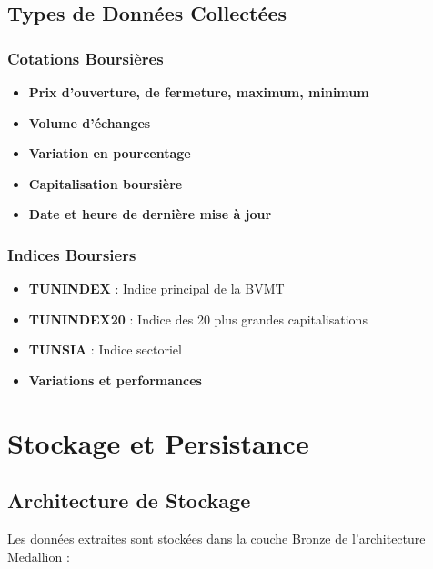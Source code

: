 \subsection{Types de Données Collectées}

\subsubsection{Cotations Boursières}

\begin{itemize}
    \item \textbf{Prix d'ouverture, de fermeture, maximum, minimum}
    \item \textbf{Volume d'échanges}
    \item \textbf{Variation en pourcentage}
    \item \textbf{Capitalisation boursière}
    \item \textbf{Date et heure de dernière mise à jour}
\end{itemize}

\subsubsection{Indices Boursiers}

\begin{itemize}
    \item \textbf{TUNINDEX} : Indice principal de la BVMT
    \item \textbf{TUNINDEX20} : Indice des 20 plus grandes capitalisations
    \item \textbf{TUNSIA} : Indice sectoriel
    \item \textbf{Variations et performances}
\end{itemize}

\section{Stockage et Persistance}

\subsection{Architecture de Stockage}

Les données extraites sont stockées dans la couche Bronze de l'architecture Medallion :



